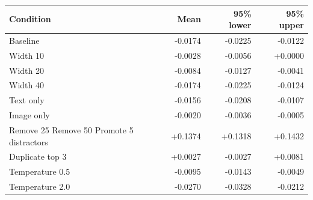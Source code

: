 \begin{tabular}{lrrr}
\toprule
Condition & Mean & 95\% lower & 95\% upper \\
\midrule
Baseline & -0.0174 & -0.0225 & -0.0122 \\
Width 10 & -0.0028 & -0.0056 & +0.0000 \\
Width 20 & -0.0084 & -0.0127 & -0.0041 \\
Width 40 & -0.0174 & -0.0225 & -0.0124 \\
Text only & -0.0156 & -0.0208 & -0.0107 \\
Image only & -0.0020 & -0.0036 & -0.0005 \\
Remove 25%
Remove 50%
Promote 5 distractors & +0.1374 & +0.1318 & +0.1432 \\
Duplicate top 3 & +0.0027 & -0.0027 & +0.0081 \\
Temperature 0.5 & -0.0095 & -0.0143 & -0.0049 \\
Temperature 2.0 & -0.0270 & -0.0328 & -0.0212 \\
\bottomrule
\end{tabular}
